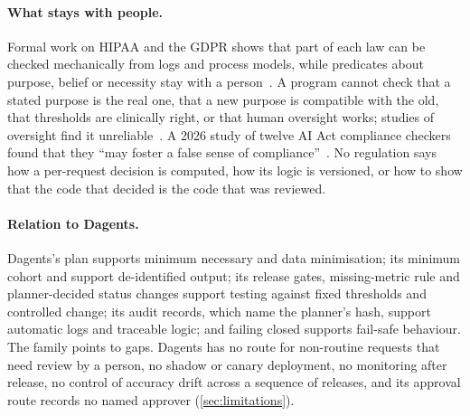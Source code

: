 \paragraph{What stays with people.} Formal work on HIPAA and the GDPR shows that
part of each law can be checked mechanically from logs and process models, while
predicates about purpose, belief or necessity stay with a
person~\citep{deyoung2010experiences,garg2011policy,basin2018purpose}. A program
cannot check that a stated purpose is the real one, that a new purpose is
compatible with the old, that thresholds are clinically right, or that human
oversight works; studies of oversight find it
unreliable~\citep{green2022flaws,laux2024institutionalised,sterz2024quest}. A
2026 study of twelve AI Act compliance checkers found that they ``may foster a
false sense of compliance''~\citep{tao2026empirical}. No regulation says how a
per-request decision is computed, how its logic is versioned, or how to show
that the code that decided is the code that was reviewed.

\paragraph{Relation to Dagents.} Dagents's  plan supports
minimum necessary and data minimisation; its minimum cohort and
 support de-identified output; its release gates, missing-metric
rule and planner-decided status changes support testing against fixed
thresholds and controlled change; its audit records, which name the planner's
hash, support automatic logs and traceable logic; and failing closed supports
fail-safe behaviour. The family points to gaps. Dagents has no route for
non-routine requests that need review by a person, no shadow or canary
deployment, no monitoring after release, no control of accuracy drift across a
sequence of releases, and its approval route records no named approver
(\cref{sec:limitations}).
